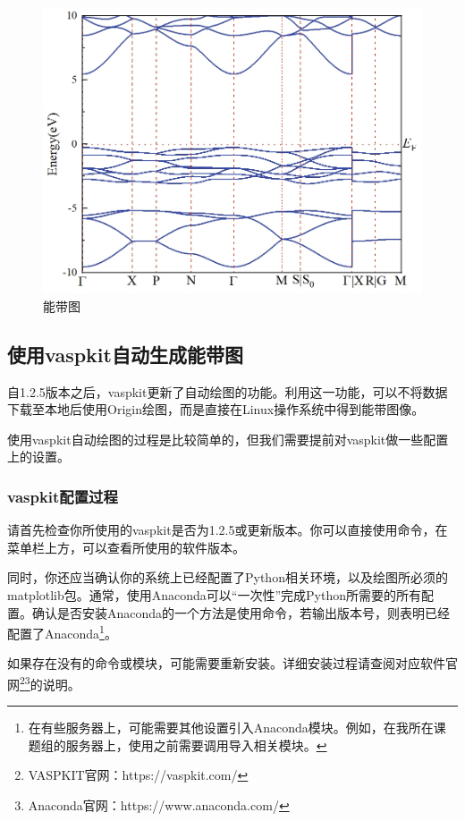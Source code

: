 \begin{figure}
    \centering
    \includegraphics[width=1\linewidth]{VASP计算/能带计算/能带绘图与后处理/fig/SiO2能带图.png}
    \caption{能带图}
    \label{fig:能带绘图与后处理-SiO2能带图}
\end{figure}

\subsection{使用vaspkit自动生成能带图}\label{subsec:能带绘图与后处理-使用vaspkit自动生成能带图}

自1.2.5版本之后，vaspkit更新了自动绘图的功能。利用这一功能，可以不将数据下载至本地后使用Origin绘图，而是直接在Linux操作系统中得到能带图像。

使用vaspkit自动绘图的过程是比较简单的，但我们需要提前对vaspkit做一些配置上的设置。

\subsubsection{vaspkit配置过程}

\begin{attention}
    请首先检查你所使用的vaspkit是否为1.2.5或更新版本。你可以直接使用命令，在菜单栏上方，可以查看所使用的软件版本。

    同时，你还应当确认你的系统上已经配置了Python相关环境，以及绘图所必须的matplotlib包。通常，使用Anaconda可以“一次性”完成Python所需要的所有配置。确认是否安装Anaconda的一个方法是使用命令，若输出版本号，则表明已经配置了Anaconda\footnote{在有些服务器上，可能需要其他设置引入Anaconda模块。例如，在我所在课题组的服务器上，使用之前需要调用导入相关模块。}。

    如果存在没有的命令或模块，可能需要重新安装。详细安装过程请查阅对应软件官网\footnote{VASPKIT官网：https://vaspkit.com/}\footnote{Anaconda官网：https://www.anaconda.com/}的说明。
\end{attention}

